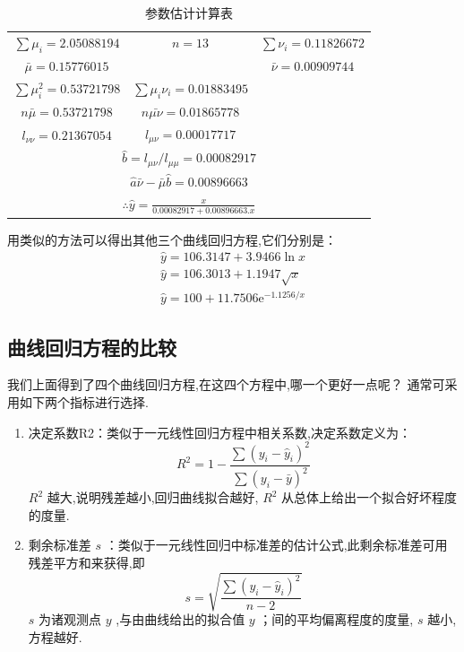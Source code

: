 \begin{table}[htb]
    \centering
    \caption{参数估计计算表}
    \begin{tabular}{ccc}
     $\sum \mu_i=2.050 88194$   &    $n=13$     &  $\sum \nu_i=0.11826672$  \\
     $\bar{\mu}=0.157 76015$   &       &  $ \bar{\nu} =0.009 097 44$  \\
     $\sum\mu_{i}^{2}=0.537 217 98$   &    $\sum\mu_i\nu_i=0.01883495$     &  \\
     $n\bar{\mu}=0.537 21798$   &   $n\bar{\mu\nu}=0.01865778$      &  \\
     $l_{\nu\nu}=0.21367054$   &   $l_{\mu\nu}=0.000 17717$      &  \\
        \multicolumn{3}{c}{ $\hat{b}=l_{\mu\nu }/l_{\mu\mu}=0.00082917$ } \\
        \multicolumn{3}{c}{ $\hat{a}\bar{\nu}-\bar{\mu}\hat{b}=0.00896663$ } \\
        \multicolumn{3}{c}{ $\therefore \widehat{y}=\frac{x}{0.00082917+0.00896663.x}$ } \\
    \end{tabular}%
    \label{tab:addlabel}%
\end{table}%
用类似的方法可以得出其他三个曲线回归方程,它们分别是：
\begin{equation}
\begin{array}{l}
{\hat{y}=106.3147+3.9466 \ln x} \\ 
{\hat{y}=106.3013+1.1947 \sqrt{x}} \\ 
{\hat{y}=100+11.7506 \mathrm{e}^{-1.1256 / x}}
\end{array}
\end{equation}

\subsection{曲线回归方程的比较}\label{sec:8.5.3}

我们上面得到了四个曲线回归方程,在这四个方程中,哪一个更好一点呢？
通常可采用如下两个指标进行选择.
\begin{enumerate}
    \item 决定系数R2：类似于一元线性回归方程中相关系数,决定系数定义为：
    \begin{equation}
    R^{2}=1-\frac{\sum\left(y_{i}-\hat{y}_{i}\right)^{2}}{\sum\left(y_{i}-\bar{y}\right)^{2}}\label{eq:8.5.5}
    \end{equation} $R^2$ 越大,说明残差越小,回归曲线拟合越好, $R^2$ 从总体上给出一个拟合好坏程度的度量.
    \item 剩余标准差 $s$ ：类似于一元线性回归中标准差的估计公式,此剩余标准差可用残差平方和来获得,即
    \begin{equation}
    s=\sqrt{\frac{\sum (y_i-\hat{y}_i)^2}{n-2}}\label{eq:8.5.6}
    \end{equation}
 $s$ 为诸观测点 $y$ ,与由曲线给出的拟合值 $y$ ；间的平均偏离程度的度量, $s$ 越小,方程越好.
\end{enumerate}

